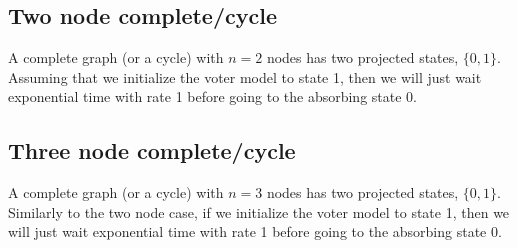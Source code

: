 \subsection{Two node complete/cycle}
A complete graph (or a cycle) with $n = 2$ nodes has two projected states, $\{0,1\}$.
Assuming that we initialize the voter model to state 1, then we will just wait exponential time with rate 1 before going to the absorbing state 0.

\subsection{Three node complete/cycle}
A complete graph (or a cycle) with $n = 3$ nodes has two projected states, $\{0,1\}$.
Similarly to the two node case, if we initialize the voter model to state 1, then we will just wait exponential time with rate 1 before going to the absorbing state 0.

